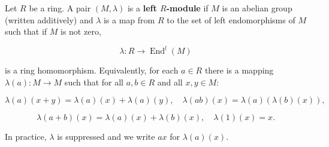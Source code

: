 Let $R$ be a ring. A pair $(M, \lambda)$ is a \textbf{left $R$-module} if $M$ is an abelian group (written additively) and $\lambda$ is a map from $R$ to the set of left endomorphisms of $M$ such that if $M$ is not zero,

$$\lambda: R \rightarrow \operatorname{End}^l(M)$$

is a ring homomorphism. Equivalently, for each $a \in R$ there is a mapping $\lambda(a): M \rightarrow M$ such that for all $a, b \in R$ and all $x, y \in M$:

$$\lambda(a)(x + y) = \lambda(a)(x) + \lambda(a)(y), \quad \lambda(ab)(x) = \lambda(a)(\lambda(b)(x)),$$

$$\lambda(a + b)(x) = \lambda(a)(x) + \lambda(b)(x), \quad \lambda(1)(x) = x.$$

In practice, $\lambda$ is suppressed and we write $a x$ for $\lambda(a)(x)$.
